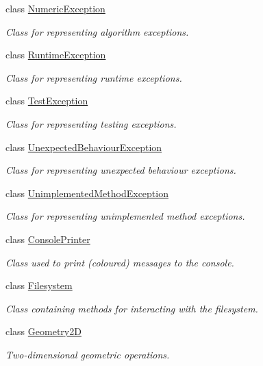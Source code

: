 \begin{DoxyCompactItemize}
class \hyperlink{classmultiscale_1_1NumericException}{Numeric\-Exception}
\begin{DoxyCompactList}\small\item\em Class for representing algorithm exceptions. \end{DoxyCompactList}\item 
class \hyperlink{classmultiscale_1_1RuntimeException}{Runtime\-Exception}
\begin{DoxyCompactList}\small\item\em Class for representing runtime exceptions. \end{DoxyCompactList}\item 
class \hyperlink{classmultiscale_1_1TestException}{Test\-Exception}
\begin{DoxyCompactList}\small\item\em Class for representing testing exceptions. \end{DoxyCompactList}\item 
class \hyperlink{classmultiscale_1_1UnexpectedBehaviourException}{Unexpected\-Behaviour\-Exception}
\begin{DoxyCompactList}\small\item\em Class for representing unexpected behaviour exceptions. \end{DoxyCompactList}\item 
class \hyperlink{classmultiscale_1_1UnimplementedMethodException}{Unimplemented\-Method\-Exception}
\begin{DoxyCompactList}\small\item\em Class for representing unimplemented method exceptions. \end{DoxyCompactList}\item 
class \hyperlink{classmultiscale_1_1ConsolePrinter}{Console\-Printer}
\begin{DoxyCompactList}\small\item\em Class used to print (coloured) messages to the console. \end{DoxyCompactList}\item 
class \hyperlink{classmultiscale_1_1Filesystem}{Filesystem}
\begin{DoxyCompactList}\small\item\em Class containing methods for interacting with the filesystem. \end{DoxyCompactList}\item 
class \hyperlink{classmultiscale_1_1Geometry2D}{Geometry2\-D}
\begin{DoxyCompactList}\small\item\em Two-\/dimensional geometric operations. \end{DoxyCompactList}\item 

\end{DoxyCompactItemize}
